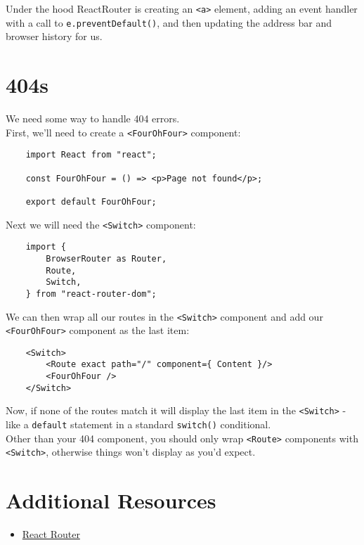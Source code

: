 Under the hood ReactRouter is creating an \texttt{<a>} element, adding an event handler with a call to \texttt{e.preventDefault()}, and then updating the address bar and browser history for us.



\section{404s}


We need some way to handle 404 errors.
\\

First, we'll need to create a \texttt{<FourOhFour>} component:

\begin{verbatim}
    import React from "react";

    const FourOhFour = () => <p>Page not found</p>;

    export default FourOhFour;
\end{verbatim}


Next we will need the \texttt{<Switch>} component:

\begin{verbatim}
    import {
        BrowserRouter as Router,
        Route,
        Switch,
    } from "react-router-dom";
\end{verbatim}

We can then wrap all our routes in the \texttt{<Switch>} component and add our \texttt{<FourOhFour>} component as the last item:

\begin{verbatim}
    <Switch>
        <Route exact path="/" component={ Content }/>
        <FourOhFour />
    </Switch>
\end{verbatim}

Now, if none of the routes match it will display the last item in the \texttt{<Switch>} - like a \texttt{default} statement in a standard \texttt{switch()} conditional.
\\

Other than your 404 component, you should only wrap \texttt{<Route>} components with \texttt{<Switch>}, otherwise things won't display as you'd expect.



\section{Additional Resources}

\begin{itemize}[leftmargin=*]
    \item \href{https://reacttraining.com/react-router/web/guides/philosophy}{React Router}
\end{itemize}
